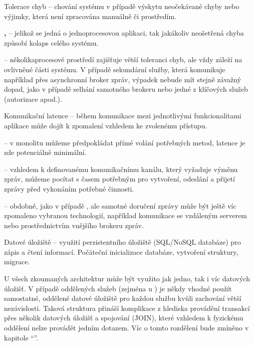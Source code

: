 \begin{dl}
   \item[Tolerace chyb] – chování systému v případě výskytu neočekávané chyby nebo výjimky, která není zpracována manuálně či  prostředím.
\end{dl}
\begin{ul}
   \item \textbf{, } – jelikož se jedná o jednoprocesovou aplikaci, tak jakákoliv neošetřená chyba způsobí kolaps celého systému.

   \newpage

   \item \textbf{} – několikaprocesové prostředí zajišťuje větší toleranci chyb, ale vždy záleží na ovlivněné části systému.
   V případě sekundární služby, která komunikuje například přes asynchronní broker zpráv, výpadek nebude mít stejně závažný dopad, jako v případě selhání samotného brokeru nebo jedné z klíčových služeb (autorizace apod.).
\end{ul}

\begin{dl}
   \item[Komunikační latence] – během komunikace mezi jednotlivými funkcionalitami aplikace může dojít k zpomalení vzhledem ke zvolenému přístupu.
\end{dl}
\begin{ul}
   \item \textbf{} – v monolitu můžeme předpokládat přímé volání potřebných metod, latence je zde potenciálně minimální.
   \item \textbf{} – vzhledem k definovanému komunikačnímu kanálu, který vyžaduje výměnu zpráv, můžeme pocítat s časem potřebným pro vytvoření, odeslání a přijetí zprávy před vykonáním potřebné činnosti.
   \item \textbf{} – obdobně, jako v případě , ale samotné doručení zprávy může být ještě víc zpomaleno vybranou technologií, například komunikace se vzdáleným serverem nebo prostřednictvím vnějšího brokeru zpráv.
\end{ul}

\begin{dl}
   \item[Datové úložiště] – využití perzistentního úložiště (SQL/NoSQL databáze) pro zápis a čtení informací.
   Počáteční inicializace databáze, vytvoření struktury, migrace.

   U všech zkoumaných architektur může být využito jak jedno, tak i víc datových úložišť.
   V případě oddělených služeb (zejména u ) je někdy vhodné použít samostatné, oddělené datové úložiště pro každou službu kvůli zachování větší nezávislosti.
   Taková struktura přináší komplikace z hlediska provádění transakcí přes několik datových úložišť a spojování (\h{JOIN}), které vzhledem k fyzickému oddělení nelze provádět jedním  dotazem.
   Víc o tomto rozdělení bude zmíněno v kapitole \enquote{}.
\end{dl}

